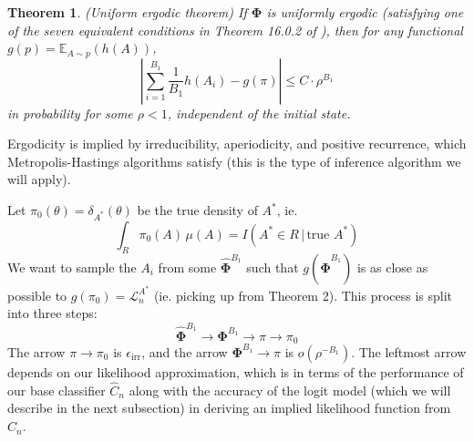 \documentclass{amsart}
\newtheorem{theorem}{Theorem}
\newcommand\E{\mathbb{E}}
\newcommand\risk{\mathcal{L}}
\begin{document}
\begin{theorem}
(Uniform ergodic theorem) If $\bm\Phi$ is uniformly ergodic (satisfying one of the seven equivalent conditions in Theorem 16.0.2 of \cite{MT93}), then for any functional $g(p)=\E_{A\sim p}(h(A))$, 
\[
\left|\sum_{i=1}^{B_1}\frac{1}{B_1} h(A_i)-g(\pi)\right|\leq C\cdot \rho^{B_1}
\]
in probability for some $\rho<1$, independent of the initial state.
\end{theorem}


Ergodicity is implied by irreducibility, aperiodicity, and positive recurrence, which Metropolis-Hastings algorithms satisfy (this is the type of inference algorithm we will apply).




Let $\pi_0(\theta)=\delta_{A^*}(\theta)$ be the true density of $A^*$, ie.
\[
\int_R\!\pi_0(A)\,\mu(A)=I(A^*\in R\,|\,\text{true }A^*)
\]
We want to sample the $A_i$ from some $\hat{\bm{\Phi}}^{B_1}$ such that $g(\hat{\bm{\Phi}}^{B_1})$ is as close as possible to $g(\pi_0)=\risk_n^{A^*}$ (ie. picking up from Theorem 2). This process is split into three steps:
\[
\hat{\bm{\Phi}}^{B_1} \to \bm{\Phi}^{B_1} \to \pi \to \pi_0
\]
The arrow $\pi\to\pi_0$ is $\epsilon_\mathrm{irr}$, and the arrow $\bm{\Phi}^{B_1}\to\pi$ is $o(\rho^{-B_1})$. The leftmost arrow depends on our likelihood approximation, which is in terms of the performance of our base classifier $\hat C_n$ along with the accuracy of the logit model (which we will describe in the next subsection) in deriving an implied likelihood function from $\hat C_n$.
\end{document}
